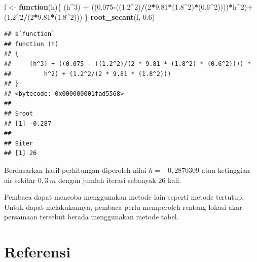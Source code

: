 \documentclass[]{book}
\newenvironment{Shaded}{\begin{snugshade}}{\end{snugshade}}
\newcommand{\ControlFlowTok}[1]{\textcolor[rgb]{0.13,0.29,0.53}{\textbf{#1}}}
\newcommand{\DecValTok}[1]{\textcolor[rgb]{0.00,0.00,0.81}{#1}}
\newcommand{\FloatTok}[1]{\textcolor[rgb]{0.00,0.00,0.81}{#1}}
\newcommand{\KeywordTok}[1]{\textcolor[rgb]{0.13,0.29,0.53}{\textbf{#1}}}
\newcommand{\NormalTok}[1]{#1}
\newcommand{\OperatorTok}[1]{\textcolor[rgb]{0.81,0.36,0.00}{\textbf{#1}}}
\newcommand{\StringTok}[1]{\textcolor[rgb]{0.31,0.60,0.02}{#1}}
\theoremstyle{definition}
\theoremstyle{definition}
\theoremstyle{definition}
\theoremstyle{remark}
\begin{document}
\begin{Shaded}
\begin{Highlighting}[]
\NormalTok{f <-}\StringTok{ }\ControlFlowTok{function}\NormalTok{(h)\{}
\NormalTok{  (h}\OperatorTok{^}\DecValTok{3}\NormalTok{) }\OperatorTok{+}\StringTok{ }\NormalTok{((}\FloatTok{0.075}\OperatorTok{-}\NormalTok{((}\FloatTok{1.2}\OperatorTok{^}\DecValTok{2}\NormalTok{)}\OperatorTok{/}\NormalTok{(}\DecValTok{2}\OperatorTok{*}\FloatTok{9.81}\OperatorTok{*}\NormalTok{(}\FloatTok{1.8}\OperatorTok{^}\DecValTok{2}\NormalTok{)}\OperatorTok{*}\NormalTok{(}\FloatTok{0.6}\OperatorTok{^}\DecValTok{2}\NormalTok{))))}\OperatorTok{*}\NormalTok{h}\OperatorTok{^}\DecValTok{2}\NormalTok{)}\OperatorTok{+}\StringTok{ }\NormalTok{(}\FloatTok{1.2}\OperatorTok{^}\DecValTok{2}\OperatorTok{/}\NormalTok{(}\DecValTok{2}\OperatorTok{*}\FloatTok{9.81}\OperatorTok{*}\NormalTok{(}\FloatTok{1.8}\OperatorTok{^}\DecValTok{2}\NormalTok{)))}
\NormalTok{\}}
\KeywordTok{root_secant}\NormalTok{(f, }\FloatTok{0.6}\NormalTok{)}
\end{Highlighting}
\end{Shaded}

\begin{verbatim}
## $`function`
## function (h) 
## {
##     (h^3) + ((0.075 - ((1.2^2)/(2 * 9.81 * (1.8^2) * (0.6^2)))) * 
##         h^2) + (1.2^2/(2 * 9.81 * (1.8^2)))
## }
## <bytecode: 0x000000001fad5568>
## 
## $root
## [1] -0.287
## 
## $iter
## [1] 26
\end{verbatim}

Berdasarkan hasil perhitungan diperoleh nilai \(h=-0,2870309\) atau ketinggian air sekitar \(0,3\ m\) dengan jumlah iterasi sebanyak \(26\) kali.

Pembaca dapat mencoba menggunakan metode lain seperti metode tertutup. Untuk dapat melakukannya, pembaca perlu memperoleh rentang lokasi akar persamaan tersebut berada menggunakan metode tabel.

\hypertarget{referensi-6}{%
\section{Referensi}\label{referensi-6}}
\end{document}
